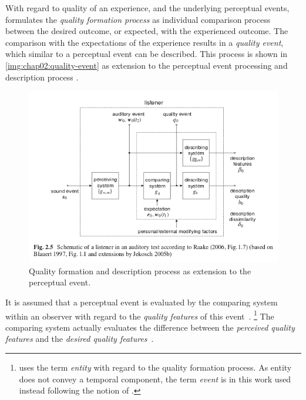 With regard to quality of an experience, and the underlying perceptual events, \cite{jekosch_voice_2005} formulates the \emph{quality formation process} as individual comparison process between the desired outcome, or expected, with the experienced outcome.
The comparison with the expectations of the experience results in a \emph{quality event}, which similar to a perceptual event can be described.
This process is shown in \autoref{img:chap02:quality-event} as extension to the perceptual event processing and description process .
\begin{figure}
	\includegraphics[width=1\textwidth]{fig/quality-event}
	\caption{Quality formation and description process as extension to the perceptual event.}
	\label{img:chap02:quality-event}
\end{figure}

It is assumed that a perceptual event is evaluated by the comparing system within an observer with regard to the \emph{quality features} of this event~\cite[cf. p. 17]{jekosch_voice_2005}.
\footnote{\cite{jekosch_voice_2005} uses the term \emph{entity} with regard to the quality formation process.
As entity does not convey a temporal component, the term \emph{event} is in this work used instead following the notion of \cite{blauert_spatial_1996}.}
The comparing system actually evaluates the difference between the \emph{perceived quality features} and the \emph{desired quality features}~\cite[p. 23]{raake_book}.

